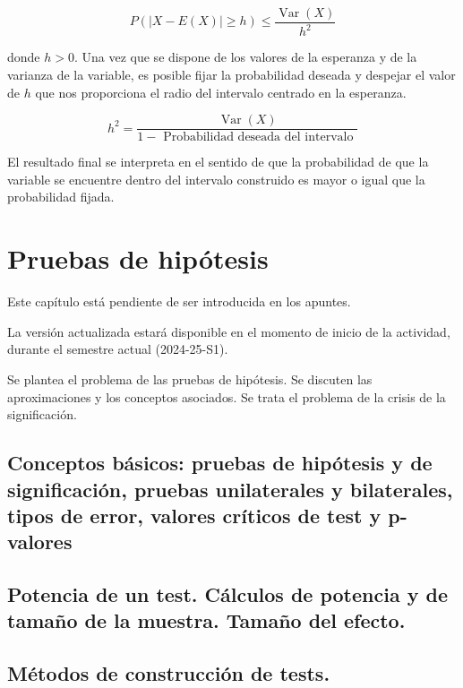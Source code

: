 \documentclass[
]{article}
\begin{document}
\[
P(|X-E(X)| \geq h) \leq \frac{\operatorname{Var}(X)}{h^{2}}
\]

donde \(h>0\).
Una vez que se dispone de los valores de la esperanza y de la varianza de la variable, es posible fijar la probabilidad deseada y despejar el valor de \(h\) que nos proporciona el radio del intervalo centrado en la esperanza.

\[
h^{2}=\frac{\operatorname{Var}(X)}{1-\text { Probabilidad deseada del intervalo }}
\]

El resultado final se interpreta en el sentido de que la probabilidad de que la variable se encuentre dentro del intervalo construido es mayor o igual que la probabilidad fijada.

\section{Pruebas de hipótesis}\label{pruebas-de-hipuxf3tesis}

Este capítulo está pendiente de ser introducida en los apuntes.

La versión actualizada estará disponible en el momento de inicio de la actividad, durante el semestre actual (2024-25-S1).

Se plantea el problema de las pruebas de hipótesis. Se discuten las aproximaciones y los conceptos asociados. Se trata el problema de la crisis de la significación.

\subsection{Conceptos básicos: pruebas de hipótesis y de significación, pruebas unilaterales y bilaterales, tipos de error, valores críticos de test y p-valores}\label{conceptos-buxe1sicos-pruebas-de-hipuxf3tesis-y-de-significaciuxf3n-pruebas-unilaterales-y-bilaterales-tipos-de-error-valores-cruxedticos-de-test-y-p-valores}

\subsection{Potencia de un test. Cálculos de potencia y de tamaño de la muestra. Tamaño del efecto.}\label{potencia-de-un-test.-cuxe1lculos-de-potencia-y-de-tamauxf1o-de-la-muestra.-tamauxf1o-del-efecto.}

\subsection{Métodos de construcción de tests.}\label{muxe9todos-de-construcciuxf3n-de-tests.}
\end{document}
